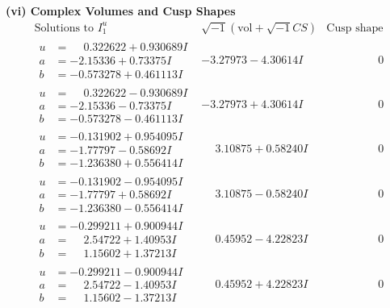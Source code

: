 \documentclass[1p]{elsarticle_modified}
\theoremstyle{definition}
\newcommand{\I}{\sqrt{-1}}
\begin{document}
\newpage\flushleft \textbf{(vi) Complex Volumes and Cusp Shapes}
$$\begin{array}{c|c|c}  
\text{Solutions to }I^u_{1}& \I (\text{vol} + \sqrt{-1}CS) & \text{Cusp shape}\\
 \hline 
\begin{aligned}
u &= \phantom{-}0.322622 + 0.930689 I \\
a &= -2.15336 + 0.73375 I \\
b &= -0.573278 + 0.461113 I\end{aligned}
 & -3.27973 - 4.30614 I & \phantom{-0.000000 } 0 \\ \hline\begin{aligned}
u &= \phantom{-}0.322622 - 0.930689 I \\
a &= -2.15336 - 0.73375 I \\
b &= -0.573278 - 0.461113 I\end{aligned}
 & -3.27973 + 4.30614 I & \phantom{-0.000000 } 0 \\ \hline\begin{aligned}
u &= -0.131902 + 0.954095 I \\
a &= -1.77797 - 0.58692 I \\
b &= -1.236380 + 0.556414 I\end{aligned}
 & \phantom{-}3.10875 + 0.58240 I & \phantom{-0.000000 } 0 \\ \hline\begin{aligned}
u &= -0.131902 - 0.954095 I \\
a &= -1.77797 + 0.58692 I \\
b &= -1.236380 - 0.556414 I\end{aligned}
 & \phantom{-}3.10875 - 0.58240 I & \phantom{-0.000000 } 0 \\ \hline\begin{aligned}
u &= -0.299211 + 0.900944 I \\
a &= \phantom{-}2.54722 + 1.40953 I \\
b &= \phantom{-}1.15602 + 1.37213 I\end{aligned}
 & \phantom{-}0.45952 - 4.22823 I & \phantom{-0.000000 } 0 \\ \hline\begin{aligned}
u &= -0.299211 - 0.900944 I \\
a &= \phantom{-}2.54722 - 1.40953 I \\
b &= \phantom{-}1.15602 - 1.37213 I\end{aligned}
 & \phantom{-}0.45952 + 4.22823 I & \phantom{-0.000000 } 0 \\ \hline\begin{aligned}

\end{aligned}
\end{array}$$
\end{document}
